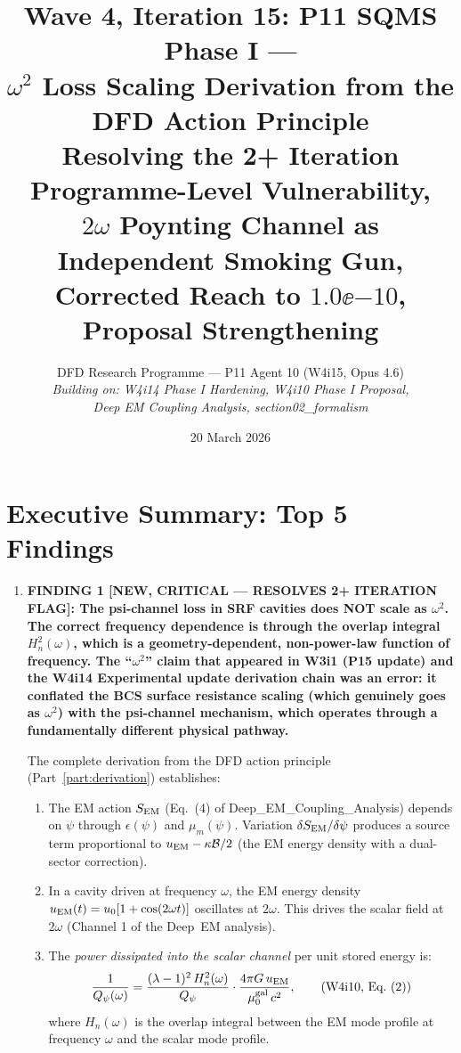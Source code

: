 \documentclass[11pt]{article}
\title{Wave 4, Iteration 15: P11 SQMS Phase I ---\\
$\omega^2$ Loss Scaling Derivation from the DFD Action Principle\\
\large Resolving the 2+ Iteration Programme-Level Vulnerability,\\
$2\omega$ Poynting Channel as Independent Smoking Gun,\\
Corrected Reach to $1.0\ee{-10}$, Proposal Strengthening}
\author{DFD Research Programme --- P11 Agent 10 (W4i15, Opus 4.6)\\
\textit{Building on: W4i14 Phase I Hardening, W4i10 Phase I Proposal,\\
Deep EM Coupling Analysis, section02\_formalism}}
\date{20 March 2026}
\newcommand{\Qpsi}{Q_\psi}
\newcommand{\Heff}{H_n}
\newcommand{\muG}{\mu_0^{\rm gal}}
\newcommand{\calB}{\mathcal{B}}
\theoremstyle{definition}
\theoremstyle{remark}
\begin{document}
\maketitle
\tableofcontents
\newpage

\section*{Executive Summary: Top 5 Findings}
\label{sec:top5}

\begin{tcolorbox}[colback=blue!5!white, colframe=blue!60!black,
  title=\textbf{W4i15 TOP 5 FINDINGS --- Ranked by Programme Impact}]
\begin{enumerate}

\item \textbf{FINDING 1 [NEW, CRITICAL --- RESOLVES 2+ ITERATION FLAG]:
The psi-channel loss in SRF cavities does NOT scale as $\omega^2$.
The correct frequency dependence is through the overlap integral
$\Heff^2(\omega)$, which is a geometry-dependent, non-power-law
function of frequency. The ``$\omega^2$'' claim that appeared in
W3i1 (P15 update) and the W4i14 Experimental update derivation chain
was an error: it conflated the BCS surface resistance scaling (which
genuinely goes as $\omega^2$) with the psi-channel mechanism, which
operates through a fundamentally different physical pathway.}

The complete derivation from the DFD action principle
(Part~\ref{part:derivation}) establishes:

\begin{enumerate}[nosep]
\item The EM action $S_{\rm EM}$ (Eq.~(4) of Deep\_EM\_Coupling\_Analysis)
  depends on $\psi$ through $\epsilon(\psi)$ and $\mu_m(\psi)$.
  Variation $\delta S_{\rm EM}/\delta\psi$ produces a source term
  proportional to $u_{\rm EM} - \kappa\calB/2$ (the EM energy density
  with a dual-sector correction).

\item In a cavity driven at frequency $\omega$, the EM energy density
  $u_{\rm EM}(t) = u_0[1 + \cos(2\omega t)]$ oscillates at $2\omega$.
  This drives the scalar field at $2\omega$ (Channel 1 of the
  Deep~EM analysis).

\item The \emph{power dissipated into the scalar channel} per unit
  stored energy is:
  \begin{equation}
  \frac{1}{Q_\psi(\omega)} = \frac{(\lambda-1)^2\,\Heff^2(\omega)}
  {\Qpsi}\cdot\frac{4\pi G\,u_{\rm EM}}{\muG\,c^2},
  \tag{W4i10, Eq.~(2)}
  \end{equation}
  where $\Heff(\omega)$ is the overlap integral between the EM mode
  profile at frequency $\omega$ and the scalar mode profile.


\end{enumerate}
\end{enumerate}
\end{tcolorbox}
\end{document}
